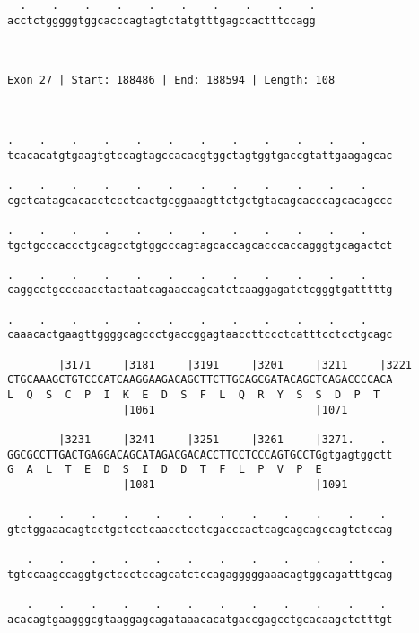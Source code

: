 \documentclass{article}
\begin{document}
\begin{Verbatim}
  .    .    .    .    .    .    .    .    .    .
acctctgggggtggcacccagtagtctatgtttgagccactttccagg
                                                
                                                
 
Exon 27 | Start: 188486 | End: 188594 | Length: 108



.    .    .    .    .    .    .    .    .    .    .    .    
tcacacatgtgaagtgtccagtagccacacgtggctagtggtgaccgtattgaagagcac
                                                            
.    .    .    .    .    .    .    .    .    .    .    .    
cgctcatagcacacctccctcactgcggaaagttctgctgtacagcacccagcacagccc
                                                            
.    .    .    .    .    .    .    .    .    .    .    .    
tgctgcccaccctgcagcctgtggcccagtagcaccagcacccaccagggtgcagactct
                                                            
.    .    .    .    .    .    .    .    .    .    .    .    
caggcctgcccaacctactaatcagaaccagcatctcaaggagatctcgggtgatttttg
                                                            
.    .    .    .    .    .    .    .    .    .    .    .    
caaacactgaagttggggcagccctgaccggagtaaccttccctcatttcctcctgcagc
                                                            
        |3171     |3181     |3191     |3201     |3211     |3221
CTGCAAAGCTGTCCCATCAAGGAAGACAGCTTCTTGCAGCGATACAGCTCAGACCCCACA
L  Q  S  C  P  I  K  E  D  S  F  L  Q  R  Y  S  S  D  P  T  
                  |1061                         |1071       
  
        |3231     |3241     |3251     |3261     |3271.    . 
GGCGCCTTGACTGAGGACAGCATAGACGACACCTTCCTCCCAGTGCCTGgtgagtggctt
G  A  L  T  E  D  S  I  D  D  T  F  L  P  V  P  E           
                  |1081                         |1091       
  
   .    .    .    .    .    .    .    .    .    .    .    . 
gtctggaaacagtcctgctcctcaacctcctcgacccactcagcagcagccagtctccag
                                                            
   .    .    .    .    .    .    .    .    .    .    .    . 
tgtccaagccaggtgctccctccagcatctccagagggggaaacagtggcagatttgcag
                                                            
   .    .    .    .    .    .    .    .    .    .    .    . 
acacagtgaagggcgtaaggagcagataaacacatgaccgagcctgcacaagctctttgt
                                                            

\end{Verbatim}
\end{document}
